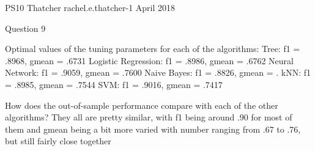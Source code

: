 PS10 Thatcher
rachel.e.thatcher-1
April 2018

Question 9

Optimal values of the tuning parameters for each of the algorithms:
Tree: f1 = .8968, gmean = .6731
Logistic Regression: f1 = .8986, gmean = .6762
Neural Network: f1 = .9059, gmean = .7600
Naive Bayes: f1 = .8826, gmean = .
kNN: f1 = .8985, gmean = .7544
SVM: f1 = .9016, gmean = .7417

How does the out-of-sample performance compare with each of the other
algorithms?
	They all are pretty similar, with f1 being around .90 for most of them and
	gmean being a bit more varied with number ranging from .67 to .76, but still
	fairly close together